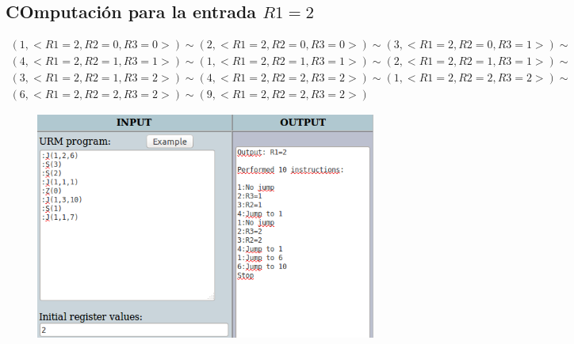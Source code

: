 	\subsection{COmputación para la entrada $R1=2$}
	\begin{equation*}\begin{gathered}
	(1, <R1=2, R2=0, R3=0>) \sim (2, <R1=2, R2=0, R3=0>) \sim (3, <R1=2, R2=0, R3=1>) \sim\\
	(4, <R1=2, R2=1, R3=1>) \sim (1, <R1=2, R2=1, R3=1>) \sim (2, <R1=2, R2=1, R3=1>) \sim\\
	(3, <R1=2, R2=1, R3=2>) \sim (4, <R1=2, R2=2, R3=2>) \sim (1, <R1=2, R2=2, R3=2>) \sim\\
	(6, <R1=2, R2=2, R3=2>) \sim (9, <R1=2, R2=2, R3=2>)
	\end{gathered}\end{equation*}
	\begin{figure}[H]
  		\centering
  		\includegraphics[scale=0.5]{images/62.png}
  	\end{figure}
